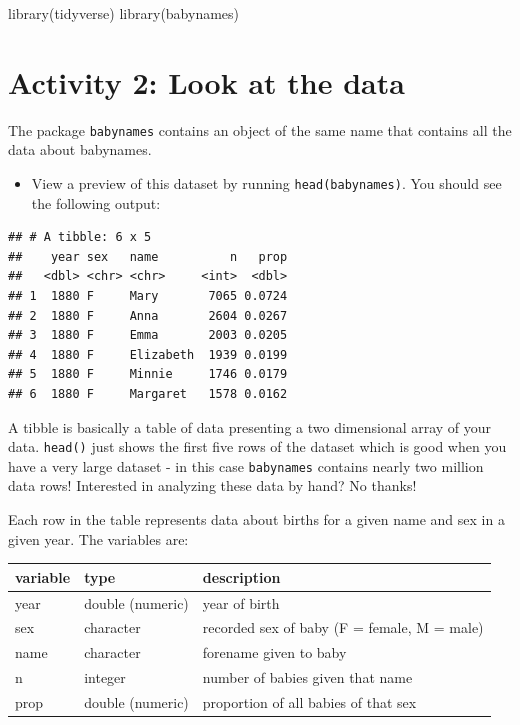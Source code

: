 \documentclass[
  oneside]{book}
\newenvironment{Shaded}{\begin{snugshade}}{\end{snugshade}}
\newcommand{\FunctionTok}[1]{\textcolor[rgb]{0.00,0.00,0.00}{#1}}
\newcommand{\NormalTok}[1]{#1}
\providecommand{\tightlist}{%
  \setlength{\itemsep}{0pt}\setlength{\parskip}{0pt}}
\begin{document}
\begin{Shaded}
\begin{Highlighting}[]
\FunctionTok{library}\NormalTok{(tidyverse)}
\FunctionTok{library}\NormalTok{(babynames)}
\end{Highlighting}
\end{Shaded}

\hypertarget{activity-2-look-at-the-data}{%
\section{Activity 2: Look at the data}\label{activity-2-look-at-the-data}}

The package \texttt{babynames} contains an object of the same name that contains all the data about babynames.

\begin{itemize}
\tightlist
\item
  View a preview of this dataset by running \texttt{head(babynames)}. You should see the following output:
\end{itemize}

\begin{verbatim}
## # A tibble: 6 x 5
##    year sex   name          n   prop
##   <dbl> <chr> <chr>     <int>  <dbl>
## 1  1880 F     Mary       7065 0.0724
## 2  1880 F     Anna       2604 0.0267
## 3  1880 F     Emma       2003 0.0205
## 4  1880 F     Elizabeth  1939 0.0199
## 5  1880 F     Minnie     1746 0.0179
## 6  1880 F     Margaret   1578 0.0162
\end{verbatim}

A tibble is basically a table of data presenting a two dimensional array of your data. \texttt{head()} just shows the first five rows of the dataset which is good when you have a very large dataset - in this case \texttt{babynames} contains nearly two million data rows! Interested in analyzing these data by hand? No thanks!

Each row in the table represents data about births for a given name and sex in a given year. The variables are:

\begin{longtable}[]{@{}lll@{}}
\toprule
variable & type & description \\
\midrule
\endhead
year & double (numeric) & year of birth \\
sex & character & recorded sex of baby (F = female, M = male) \\
name & character & forename given to baby \\
n & integer & number of babies given that name \\
prop & double (numeric) & proportion of all babies of that sex \\
\bottomrule
\end{longtable}
\end{document}
